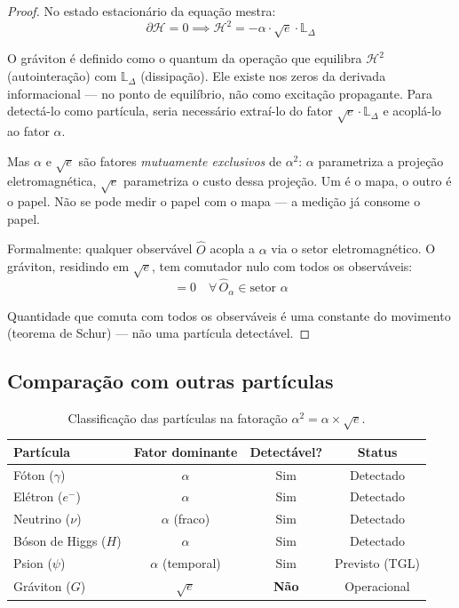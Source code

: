 \documentclass[12pt,a4paper,twoside]{article}
\newcommand{\alphaii}{\alpha^{2}}
\newcommand{\psion}{\psi}
\begin{document}
\begin{proof}
No estado estacionário da equação mestra:
\begin{equation}
\partial\mathcal{H} = 0 \implies \mathcal{H}^2 = -\alpha \cdot \sqrt{e} \cdot \mathbb{L}_\Delta
\end{equation}

O gráviton é definido como o quantum da operação que equilibra $\mathcal{H}^2$ (autointeração) com $\mathbb{L}_\Delta$ (dissipação). Ele existe nos zeros da derivada informacional --- no ponto de equilíbrio, não como excitação propagante. Para detectá-lo como partícula, seria necessário extraí-lo do fator $\sqrt{e} \cdot \mathbb{L}_\Delta$ e acoplá-lo ao fator $\alpha$.

Mas $\alpha$ e $\sqrt{e}$ são fatores \textit{mutuamente exclusivos} de $\alphaii$: $\alpha$ parametriza a projeção eletromagnética, $\sqrt{e}$ parametriza o custo dessa projeção. Um é o mapa, o outro é o papel. Não se pode medir o papel com o mapa --- a medição já consome o papel.

Formalmente: qualquer observável $\hat{O}$ acopla a $\alpha$ via o setor eletromagnético. O gráviton, residindo em $\sqrt{e}$, tem comutador nulo com todos os observáveis:
\begin{equation}
[\hat{G}_{\text{gráviton}}, \hat{O}_\alpha] = 0 \quad \forall\, \hat{O}_\alpha \in \text{setor } \alpha
\end{equation}

Quantidade que comuta com todos os observáveis é uma constante do movimento (teorema de Schur) --- não uma partícula detectável.
\end{proof}

\subsection{Comparação com outras partículas}

\begin{table}[H]
\centering
\caption{Classificação das partículas na fatoração $\alphaii = \alpha \times \sqrt{e}$.}
\label{tab:particulas}
\begin{tabular}{lccc}
\toprule
\textbf{Partícula} & \textbf{Fator dominante} & \textbf{Detectável?} & \textbf{Status} \\
\midrule
Fóton ($\gamma$) & $\alpha$ & Sim & Detectado \\
Elétron ($e^-$) & $\alpha$ & Sim & Detectado \\
Neutrino ($\nu$) & $\alpha$ (fraco) & Sim & Detectado \\
Bóson de Higgs ($H$) & $\alpha$ & Sim & Detectado \\
Psion ($\psion$) & $\alpha$ (temporal) & Sim & Previsto (TGL) \\
\midrule
Gráviton ($G$) & $\sqrt{e}$ & \textbf{Não} & Operacional \\
\bottomrule
\end{tabular}
\end{table}
\end{document}
